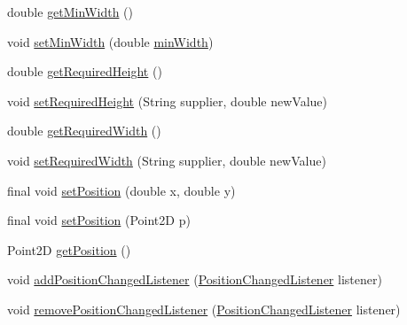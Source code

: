 \begin{DoxyCompactItemize}
\item 
double \hyperlink{classorg_1_1tzi_1_1use_1_1gui_1_1views_1_1diagrams_1_1elements_1_1_placeable_node_a4c1417919dcbe6274b5e832e309ec840}{get\-Min\-Width} ()
\item 
void \hyperlink{classorg_1_1tzi_1_1use_1_1gui_1_1views_1_1diagrams_1_1elements_1_1_placeable_node_a18ebd8205f8d906e656f9030514e5f67}{set\-Min\-Width} (double \hyperlink{classorg_1_1tzi_1_1use_1_1gui_1_1views_1_1diagrams_1_1elements_1_1_placeable_node_ab1784ddd1aedb47ed56dab7205a644e2}{min\-Width})
\item 
double \hyperlink{classorg_1_1tzi_1_1use_1_1gui_1_1views_1_1diagrams_1_1elements_1_1_placeable_node_a9e0d7e1c357f7a507838b86f03a6d4db}{get\-Required\-Height} ()
\item 
void \hyperlink{classorg_1_1tzi_1_1use_1_1gui_1_1views_1_1diagrams_1_1elements_1_1_placeable_node_a67c3675fed3992cffb7f63e69999a0e0}{set\-Required\-Height} (String supplier, double new\-Value)
\item 
double \hyperlink{classorg_1_1tzi_1_1use_1_1gui_1_1views_1_1diagrams_1_1elements_1_1_placeable_node_a5ade916b8b3f10d4576d1eb63928459a}{get\-Required\-Width} ()
\item 
void \hyperlink{classorg_1_1tzi_1_1use_1_1gui_1_1views_1_1diagrams_1_1elements_1_1_placeable_node_a54c0707b5cb558fd3615e726226a0556}{set\-Required\-Width} (String supplier, double new\-Value)
\item 
final void \hyperlink{classorg_1_1tzi_1_1use_1_1gui_1_1views_1_1diagrams_1_1elements_1_1_placeable_node_a308ce2fbf8c26e76232d619cf45b863a}{set\-Position} (double x, double y)
\item 
final void \hyperlink{classorg_1_1tzi_1_1use_1_1gui_1_1views_1_1diagrams_1_1elements_1_1_placeable_node_a184a910977ff0b4545d417dd5822f4b1}{set\-Position} (Point2\-D p)
\item 
Point2\-D \hyperlink{classorg_1_1tzi_1_1use_1_1gui_1_1views_1_1diagrams_1_1elements_1_1_placeable_node_ac53b9de9e2f12868bd20bb25882fcc50}{get\-Position} ()
\item 
void \hyperlink{classorg_1_1tzi_1_1use_1_1gui_1_1views_1_1diagrams_1_1elements_1_1_placeable_node_a4cb7bb22bfae631342758d36e923a341}{add\-Position\-Changed\-Listener} (\hyperlink{interfaceorg_1_1tzi_1_1use_1_1gui_1_1views_1_1diagrams_1_1_position_changed_listener}{Position\-Changed\-Listener} listener)
\item 
void \hyperlink{classorg_1_1tzi_1_1use_1_1gui_1_1views_1_1diagrams_1_1elements_1_1_placeable_node_a441aa1ee8a1125b4b5d1c4c715323d7a}{remove\-Position\-Changed\-Listener} (\hyperlink{interfaceorg_1_1tzi_1_1use_1_1gui_1_1views_1_1diagrams_1_1_position_changed_listener}{Position\-Changed\-Listener} listener)

\end{DoxyCompactItemize}
